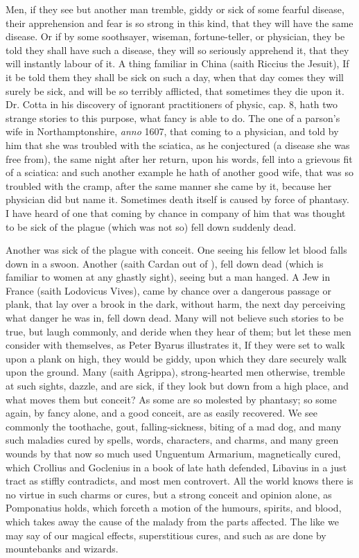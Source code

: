 {{Men, if they see but another man tremble, giddy or sick of some fearful
disease, their apprehension and fear is so strong in this kind, that
they will have the same disease. Or if by some soothsayer, wiseman,
fortune-teller, or physician, they be told they shall have such a
disease, they will so seriously apprehend it, that they will instantly
labour of it. A thing familiar in China (saith Riccius the Jesuit),
If it be told them they shall be sick on such a day, when that
day comes they will surely be sick, and will be so terribly afflicted,
that sometimes they die upon it. Dr. Cotta in his discovery of ignorant
practitioners of physic, cap. 8, hath two strange stories to this
purpose, what fancy is able to do. The one of a parson's wife in
Northamptonshire, \emph{anno} 1607, that coming to a physician, and told by
him that she was troubled with the sciatica, as he conjectured (a
disease she was free from), the same night after her return, upon his
words, fell into a grievous fit of a sciatica: and such another example
he hath of another good wife, that was so troubled with the cramp,
after the same manner she came by it, because her physician did but
name it. Sometimes death itself is caused by force of phantasy. I have
heard of one that coming by chance in company of him that was thought
to be sick of the plague (which was not so) fell down suddenly dead.

Another was sick of the plague with conceit. One seeing his fellow let
blood falls down in a swoon. Another (saith Cardan out of
\Aristotle), fell down dead (which is familiar to women at any ghastly
sight), seeing but a man hanged. A Jew in France (saith Lodovicus
Vives), came by chance over a dangerous passage or plank, that lay over
a brook in the dark, without harm, the next day perceiving what danger
he was in, fell down dead. Many will not believe such stories to be
true, but laugh commonly, and deride when they hear of them; but let
these men consider with themselves, as Peter Byarus illustrates
it, If they were set to walk upon a plank on high, they would be giddy,
upon which they dare securely walk upon the ground. Many (saith
Agrippa), strong-hearted men otherwise, tremble at such sights,
dazzle, and are sick, if they look but down from a high place, and what
moves them but conceit? As some are so molested by phantasy; so some
again, by fancy alone, and a good conceit, are as easily recovered. We
see commonly the toothache, gout, falling-sickness, biting of a mad
dog, and many such maladies cured by spells, words, characters, and
charms, and many green wounds by that now so much used Unguentum
Armarium, magnetically cured, which Crollius and Goclenius in a book of
late hath defended, Libavius in a just tract as stiffly contradicts,
and most men controvert. All the world knows there is no virtue in such
charms or cures, but a strong conceit and opinion alone, as
Pomponatius holds, which forceth a motion of the humours,
spirits, and blood, which takes away the cause of the malady from the
parts affected. The like we may say of our magical effects,
superstitious cures, and such as are done by mountebanks and wizards.

}}
